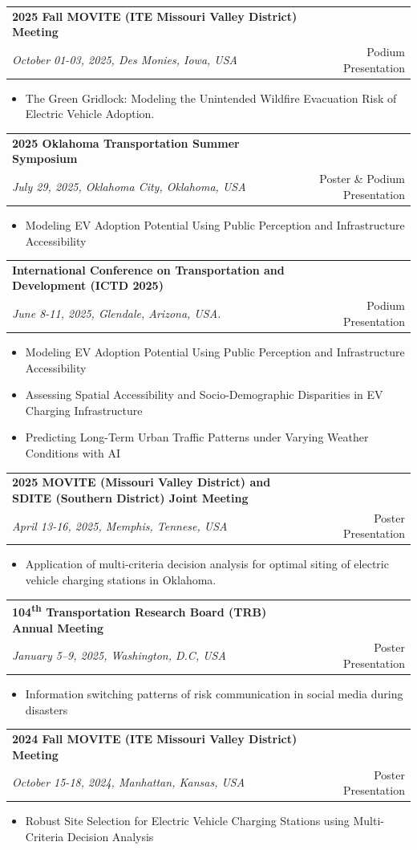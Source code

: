 \documentclass[a4paper,11pt]{article}
\makeatletter
\newcommand{\resumeProject}[4]{
\vspace{0.5mm}\item
    \begin{tabular*}{0.98\textwidth}[t]{l@{\extracolsep{\fill}}r}
        \textbf{#1} & \textit{\footnotesize{#3}} \\
        \footnotesize{\textit{#2}} & \footnotesize{#4}
    \end{tabular*}
    \vspace{-2.4mm}
}
\newcommand{\resumeItemListStart}{\begin{itemize}[leftmargin=*,labelsep=1mm,itemsep=0.5mm]}
\newcommand{\resumeItemListEnd}{\end{itemize}\vspace{-2mm}}
\makeatother
\begin{document}
\resumeProject
  {\textcolor{mycolor}{2025 Fall MOVITE (ITE Missouri Valley District) Meeting}}
  {October 01-03, 2025, Des Monies, Iowa, USA}{}{{Podium Presentation}}
\resumeItemListStart
  \item The Green Gridlock: Modeling the Unintended Wildfire Evacuation Risk of Electric Vehicle Adoption.
\resumeItemListEnd


\resumeProject
  {\textcolor{mycolor}{2025 Oklahoma Transportation Summer Symposium}}
  {July 29, 2025, Oklahoma City, Oklahoma, USA}{}{{Poster \& Podium Presentation}}
\resumeItemListStart
    \item Modeling EV Adoption Potential Using Public Perception and Infrastructure Accessibility
\resumeItemListEnd

\resumeProject
  {\textcolor{mycolor}{International Conference on Transportation and Development (ICTD 2025)}}
  {June 8-11, 2025, Glendale, Arizona, USA.}{}{{Podium Presentation}}
\resumeItemListStart
    \item Modeling EV Adoption Potential Using Public Perception and Infrastructure Accessibility
    \item Assessing Spatial Accessibility and Socio-Demographic Disparities in EV Charging Infrastructure
    \item Predicting Long-Term Urban Traffic Patterns under Varying Weather Conditions with AI
\resumeItemListEnd


\resumeProject
  {\textcolor{mycolor}{2025 MOVITE (Missouri Valley District) and SDITE (Southern District) Joint Meeting}}
  {April 13-16, 2025, Memphis, Tennese, USA}{}{{Poster Presentation}}
\resumeItemListStart
  \item Application of multi-criteria decision analysis for optimal siting of electric vehicle charging stations in Oklahoma.
\resumeItemListEnd


\resumeProject
  {\textcolor{mycolor}{104\textsuperscript{th} Transportation Research Board (TRB) Annual Meeting}}
  {January 5–9, 2025, Washington, D.C, USA}{}{{Poster Presentation}}
\resumeItemListStart
    \item Information switching patterns of risk communication in social media during disasters
\resumeItemListEnd



\resumeProject
  {\textcolor{mycolor}{2024 Fall MOVITE (ITE Missouri Valley District) Meeting}}
  {October 15-18, 2024, Manhattan, Kansas, USA}{}{{Poster Presentation}}
\resumeItemListStart
  \item Robust Site Selection for Electric Vehicle Charging Stations using Multi-Criteria Decision Analysis
\resumeItemListEnd
\end{document}
